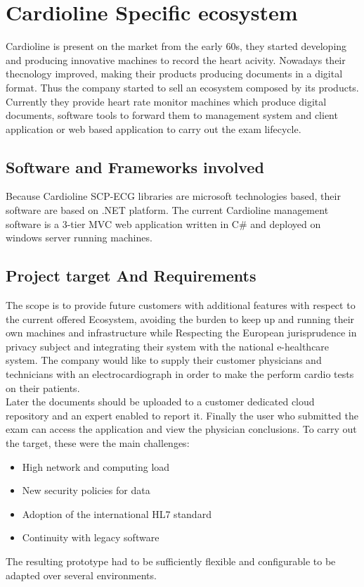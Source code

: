 \chapter{Cardioline Specific ecosystem}
\label{chapter:cardioline_specific_ecosystem}
Cardioline is present on the market from the early 60s, they started developing and producing innovative machines to record the heart acivity. Nowadays their thecnology improved, making their products producing documents in a digital format.
Thus the company started to sell an ecosystem composed by its products. Currently they provide heart rate monitor machines which produce digital documents, software tools to forward them to management system and client application or web based application to carry out the exam lifecycle.

\section{Software and Frameworks involved}
Because Cardioline SCP-ECG libraries are microsoft technologies based, their software are based on .NET platform.
The current Cardioline management software is a 3-tier MVC web application written in C# and deployed on windows server running machines.

\section{Project target And Requirements}
The scope is to provide future customers with additional features with respect to the current offered Ecosystem, avoiding the burden to keep up and running their own machines and infrastructure while Respecting the European jurisprudence in privacy subject and integrating their system with the national e-healthcare system. The company would like to supply their customer physicians and technicians with an electrocardiograph in order to make the perform cardio tests on their patients.\\
Later the documents should be uploaded to a customer dedicated cloud repository and an expert enabled to report it. Finally the user who submitted the exam can access the application and view the physician conclusions.
To carry out the target, these were the main challenges:
\begin{itemize}
    \item High network and computing load
    \item New security policies for data
    \item Adoption of the international HL7 standard
    \item Continuity with legacy software
\end{itemize}
The resulting prototype had to be sufficiently flexible and configurable to be adapted over several environments.

